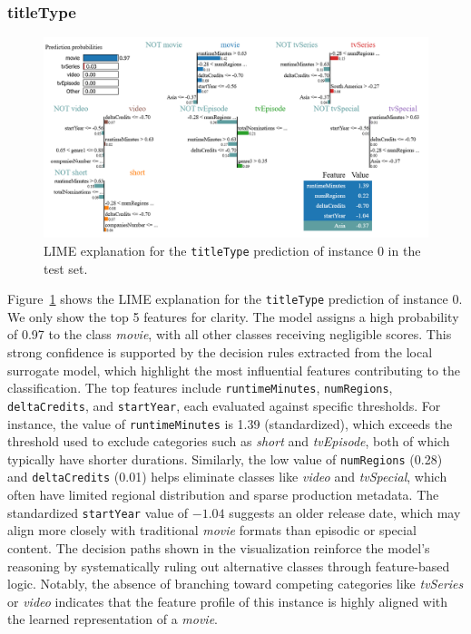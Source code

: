 \subsubsection{titleType}

 
\begin{figure}[htbp]
    \centering
    \includegraphics[width=\linewidth]{plotsss/Lime_title.png}
    \caption{LIME explanation for the \texttt{titleType} prediction of instance 0 in the test set.}
    \label{fig:LIME_title}
\end{figure}
Figure~\ref{fig:LIME_title} shows the LIME explanation for the \texttt{titleType} prediction of instance 0. We only show the top 5 features for clarity.
The model assigns a high probability of 0.97 to the class \textit{movie}, with all other classes receiving negligible scores. 
This strong confidence is supported by the decision rules extracted from the local surrogate model, which highlight 
the most influential features contributing to the classification. 
The top features include \texttt{runtimeMinutes}, \texttt{numRegions}, \texttt{deltaCredits}, and \texttt{startYear}, 
each evaluated against specific thresholds. For instance, the value of \texttt{runtimeMinutes} is 1.39 (standardized), 
which exceeds the threshold used to exclude categories such as \textit{short} and \textit{tvEpisode}, 
both of which typically have shorter durations. Similarly, the low value of \texttt{numRegions} (0.28) and \texttt{deltaCredits} (0.01) 
helps eliminate classes like \textit{video} and \textit{tvSpecial}, which often have limited regional distribution and sparse production metadata. 
The standardized \texttt{startYear} value of $-1.04$ suggests an older release date, 
which may align more closely with traditional \textit{movie} formats than episodic or special content. 
The decision paths shown in the visualization reinforce the model's reasoning by systematically ruling out 
alternative classes through feature-based logic. Notably, the absence of branching toward competing categories 
like \textit{tvSeries} or \textit{video} indicates that the feature profile of this instance is highly aligned with the 
learned representation of a \textit{movie}. \\

